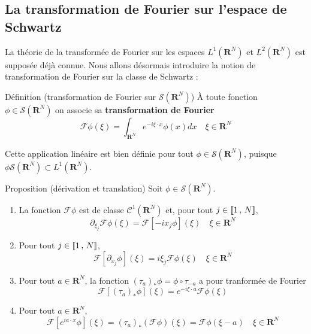    \subsection{La transformation de Fourier sur l’espace de Schwartz}

        La théorie de la transformée de Fourier sur les espaces $L^1(\mathbf{R}^N)$ et $L^2(\mathbf{R}^N)$ est supposée déjà connue. Nous allons désormais introduire la notion de transformation de Fourier sur la classe de Schwartz :

        \begin{omed}{Définition (transformation de Fourier sur $\mathcal{S}(\mathbf{R}^N)$)}
            À toute fonction $\phi \in \mathcal{S}(\mathbf{R}^N)$ on associe sa \textbf{transformation de Fourier}
            \[ \mathcal{F}\phi(\xi) = \int_{\mathbf{R}^N} e^{- i \xi \cdot x} \phi(x) dx \quad \xi \in \mathbf{R}^N \]  
        \end{omed}

        Cette application linéaire est bien définie pour tout $\phi \in \mathcal{S}(\mathbf{R}^N)$, puisque $\phi\mathcal{S}(\mathbf{R}^N) \subset L^1(\mathbf{R}^N)$.

        \begin{omed}{Proposition (dérivation et translation)}
            Soit $\phi \in \mathcal{S}(\mathbf{R}^N)$. 
            \begin{enumerate}[label=($p_{\arabic*}$)]
                \item La fonction $\mathcal{F}\phi$ est de classe $\mathcal{C}^1(\mathbf{R}^N)$ et, pour tout $j \in \left[\!\left[ 1 \, , \, N \right]\!\right]$, 
                \[ \partial_{\xi_{j}} \mathcal{F}\phi(\xi) = \mathcal{F}[-ix_j \phi](\xi) \quad \xi \in \mathbf{R}^N \]    
                \item Pour tout $j \in \left[\!\left[ 1 \, , \, N \right]\!\right]$,
                \[ \mathcal{F}[\partial_{x_j}\phi](\xi) = i \xi_j \mathcal{F}\phi(\xi) \quad \xi \in \mathbf{R}^N \]
                \item Pour tout $a \in \mathbf{R}^N$, la fonction $(\tau_a)_* \phi = \phi \circ \tau_{-a}$ a pour tranformée de Fourier 
                \[ \mathcal{F}[(\tau_a)_*\phi](\xi) = e^{-i \xi \cdot a} \mathcal{F}\phi(\xi) \]    
                \item Pour tout $a \in \mathbf{R}^N$, 
                \[ \mathcal{F}[e^{i a \cdot x} \phi](\xi) = (\tau_a)_*(\mathcal{F}\phi)(\xi) = \mathcal{F}\phi(\xi - a) \quad \xi \in \mathbf{R}^N \]   
            \end{enumerate}
        \end{omed}

